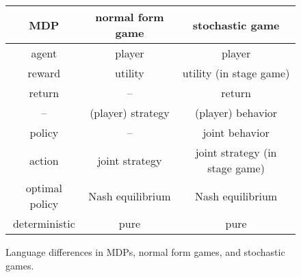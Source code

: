 \vspace{.5in}

\begin{figure}
\begin{tabular}{|c|c|c|}
    \hline
     MDP &  normal form game & stochastic game \\
    \hline
     agent &  player & player \\
     reward &  utility & utility (in stage game) \\
     return &  -- & return \\
     -- &  (player) strategy & (player) behavior \\
     policy &  -- & joint behavior \\
     action &  joint strategy & joint strategy (in stage game) \\
     optimal policy &  Nash equilibrium & Nash equilibrium \\
     deterministic &  pure & pure \\
    \hline
\end{tabular}
\caption{Language differences in MDPs, normal form games, and stochastic games.}
\label{fig:languagediff}
\end{figure}